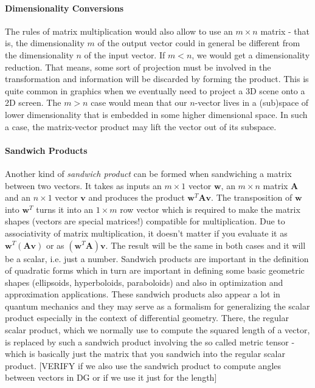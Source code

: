 

\paragraph{Dimensionality Conversions}
The rules of matrix multiplication would also allow to use an $m \times n$ matrix - that is, the dimensionality $m$ of the output vector could in general be different from the dimensionality $n$ of the input vector. If $m < n$, we would get a dimensionality reduction. That means, some sort of projection must be involved in the transformation and information will be discarded by forming the product. This is quite common in graphics when we eventually need to project a 3D scene onto a 2D screen. The $m > n$ case would mean that our $n$-vector lives in a (sub)space of lower dimensionality that is embedded in some higher dimensional space. In such a case, the matrix-vector product may lift the vector out of its subspace.

\paragraph{Sandwich Products}
Another kind of \emph{sandwich product} can be formed when sandwiching a matrix between two vectors. It takes as inputs an $m \times 1$ vector $\mathbf{w}$, an $m \times n$ matrix $\mathbf{A}$ and an $n \times 1$ vector $\mathbf{v}$ and produces the product $\mathbf{w}^T \mathbf{A v}$. The transposition of $\mathbf{w}$ into $\mathbf{w}^T$ turns it into an $1 \times m$ row vector which is required to make the matrix shapes (vectors are special matrices!) compatible for multiplication. Due to associativity of matrix multiplication, it doesn't matter if you evaluate it as $\mathbf{w}^T (\mathbf{A v})$ or as $(\mathbf{w}^T \mathbf{A}) \mathbf{v}$. The result will be the same in both cases and it will be a scalar, i.e. just a number. Sandwich products are important in the definition of quadratic forms which in turn are important in defining some basic geometric shapes (ellipsoids, hyperboloids, paraboloids) and also in optimization and approximation applications. These sandwich products also appear a lot in quantum mechanics and they may serve as a formalism for generalizing the scalar product especially in the context of differential geometry.  There, the regular scalar product, which we normally use to compute the squared length of a vector, is replaced by such a sandwich product involving the so called metric tensor - which is basically just the matrix that you sandwich into the regular scalar product. [VERIFY if we also use the sandwich product to compute angles between vectors in DG or if we use it just for the length]








